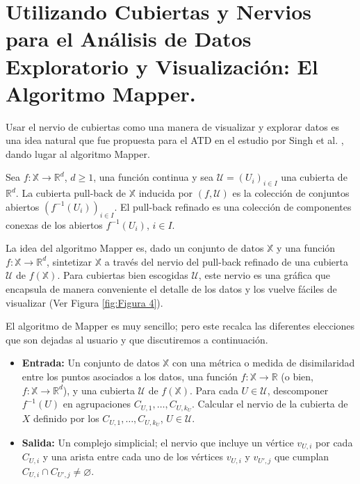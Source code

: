 \chapter{Utilizando Cubiertas y Nervios para el An\'alisis de Datos Exploratorio y Visualizaci\'on: El
Algoritmo Mapper.}

Usar el nervio de cubiertas como una manera de visualizar y explorar datos es una idea natural que fue
propuesta para el ATD en el estudio por Singh et al. \cite{Singh2007}, dando lugar al algoritmo Mapper.

\begin{definicion}
    Sea $f:\mathbb{X}\rightarrow\mathbb{R}^{d}$, $d\geq1$, una funci\'on continua y sea
    $\mathcal{U} = \left(U_{i}\right)_{i\in I}$ una cubierta de $\mathbb{R}^{d}$. La cubierta pull-back
    de $\mathbb{X}$ inducida por $\left(f, \mathcal{U}\right)$ es la colecci\'on de conjuntos abiertos
    $\left(f^{-1}\left(U_{i}\right)\right)_{i\in I}$. El pull-back refinado es una colecci\'on de
    componentes conexas de los abiertos $f^{-1}\left(U_{i}\right)$, $i\in I$.
\end{definicion}

La idea del algoritmo Mapper es, dado un conjunto de datos $\mathbb{X}$ y una funci\'on
$f:\mathbb{X}\rightarrow\mathbb{R}^{d}$, sintetizar $\mathbb{X}$ a trav\'es del nervio
del pull-back refinado de una cubierta $\mathcal{U}$ de $f\left(\mathbb{X}\right)$. Para cubiertas bien
escogidas $\mathcal{U}$, este nervio es una gr\'afica que encapsula de manera conveniente el detalle de los
datos y los vuelve f\'aciles de visualizar (Ver Figura \ref{fig:Figura 4}).

El algoritmo de Mapper es muy sencillo; pero este recalca las diferentes elecciones que son dejadas al
usuario y que discutiremos a continuaci\'on.

\begin{itemize}
    \item \textbf{Entrada:} Un conjunto de datos $\mathbb{X}$ con una m\'etrica o medida de disimilaridad
    entre los puntos asociados a los datos, una funci\'on $f:\mathbb{X}\rightarrow\mathbb{R}$
    (o bien, $f:\mathbb{X}\rightarrow\mathbb{R}^{d}$), y una cubierta $\mathcal{U}$
    de $f\left(\mathbb{X}\right)$.
    Para cada $U\in\mathcal{U}$, descomponer $f^{-1}\left(U\right)$ en agrupaciones
    $C_{U,1}, \dots, C_{U,k_{U}}$. Calcular el nervio de la cubierta de $X$ definido por los
    $C_{U,1}, \dots, C_{U,k_{U}}$, $U\in\mathcal{U}$.
    
    \item \textbf{Salida:} Un complejo simplicial; el nervio que incluye un v\'ertice $v_{U,i}$ por cada
    $C_{U,i}$ y una arista entre cada uno de los v\'ertices $v_{U,i}$ y $v_{U',j}$ que cumplan
    $C_{U,i}\cap C_{U',j} \neq \varnothing$.
    
\end{itemize}

